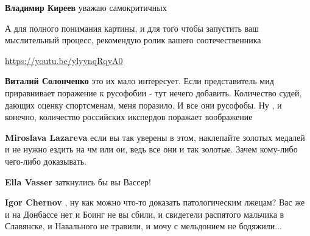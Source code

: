 \begin{itemize}
\begin{itemize}
\textbf{Владимир Киреев} уважаю самокритичных

 

А для полного понимания картины, и для того чтобы запустить ваш мыслительный процесс, рекомендую ролик вашего соотечественника 

\url{https://youtu.be/ylyynqRqyA0}

 
\textbf{Виталий Солонченко} это их мало интересует. Если представитель мид
приравнивает поражение к русофобии - тут нечего добавить. Количество судей,
дающих оценку спортсменам, меня поразило. И все они русофобы. Ну , и конечно,
количество российских икспердов поражает воображение

 
\textbf{Miroslava Lazareva} если вы так уверены в этом, наклепайте золотых
медалей и не нужно ездить на чм или ои, ведь все они и так золотые. Зачем
кому-либо чего-либо доказывать.

 
\textbf{Ella Vasser} заткнулись бы вы Вассер!

 
\textbf{Igor Chernov} , ну как можно что-то доказать патологическим лжецам? Вас же и на Донбассе нет и Боинг не вы сбили, и свидетели распятого мальчика в Славянске, и Навального не травили, и мочу с мельдонием не бодяжили...\Laughey[1.0][white]\Laughey[1.0][white]\Laughey[1.0][white]


\end{itemize}
\end{itemize}
